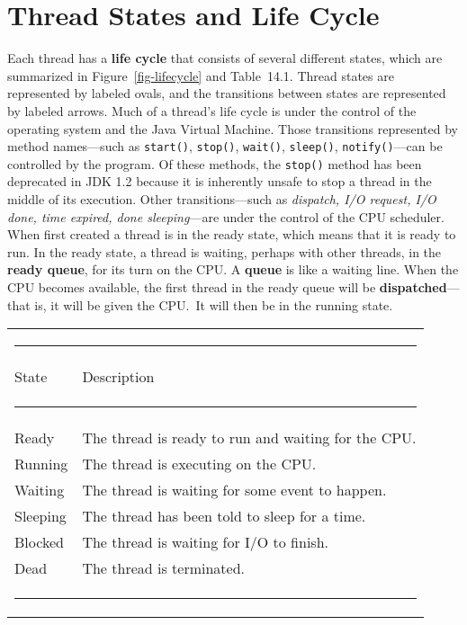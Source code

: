 \section{Thread States and Life Cycle}
\noindent Each thread has a {\bf life cycle} that
consists of several different states, which are summarized in
Figure~\ref{fig-lifecycle} and Table~14.1.  Thread states are
represented by labeled ovals, and the transitions between states are
represented by labeled arrows. Much
of a thread's life cycle is under the control of the operating system
and the Java Virtual \mbox{Machine.}  Those transitions represented by method names---such as
{\tt start()}, {\tt stop()}, {\tt wait()}, {\tt sleep()}, {\tt notify()}---can be controlled
by the program.  Of these methods, the {\tt stop()} method has been
deprecated in JDK 1.2 because it is inherently unsafe to stop a thread
in the middle of its execution.  Other transitions---such as {\it dispatch, I/O
request, I/O done, time expired, done sleeping}---are under the
control of the CPU scheduler. When first created a thread is in the
ready state, which means that it is ready to run.   In the ready state,
a thread is waiting, perhaps with other threads, in the 
{\bf ready queue}, 
for its turn on the CPU.  A {\bf queue} is like a waiting
line.  When the CPU becomes available, the first thread in the ready
queue will be {\bf dispatched}---that is, it will be given the
CPU.~It will then be in the running state.

\begin{table}[t]
\hspace*{2pc}\begin{tabular}{ll}
\multicolumn{2}{l}{\color{cyan}\rule{22pc}{1pt}}\\[2pt]
{State} & {Description}
\\[-4pt]\multicolumn{2}{l}{\color{cyan}\rule{22pc}{0.5pt}}\\[2pt]
Ready      & The thread is ready to run and waiting for the CPU.\\[2pt]
Running    & The thread is executing on the CPU.\\[2pt]
Waiting    & The thread is waiting for some event to happen.\\[2pt]
Sleeping   & The thread has been told to sleep for a time.\\[2pt]
Blocked    & The thread is waiting for I/O to finish.\\[2pt]
Dead       & The thread is terminated.
\\[-4pt]\multicolumn{2}{l}{\color{cyan}\rule{22pc}{1pt}}
\end{tabular}
\endTB
\end{table}

